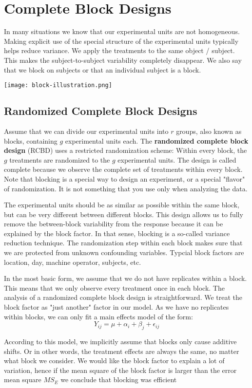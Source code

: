 \section{Complete Block Designs}

In many situations we know that our experimental units are not homogeneous. Making explicit use of the special structure of the experimental units typically helps reduce variance. We apply the treatments to the same object / subject. This makes the subject-to-subject variability completely disappear. We also say that we block on subjects or that an individual subject is a block.
\begin{center}
	\texttt{[image: block-illustration.png]}
\end{center}


\subsection{Randomized Complete Block Designs}

Assume that we can divide our experimental units into $r$ groups, also known as blocks, containing $g$ experimental units each. The \textbf{randomized complete block design} (RCBD) uses a restricted randomization scheme: Within every block, the $g$ treatments are randomized to the $g$ experimental units. The design is called complete because we observe the complete set of treatments within every block. Note that blocking is a special way to design an experiment, or a special "flavor" of randomization. It is not something that you use only when analyzing the data. \medskip

The experimental units should be as similar as possible within the same block, but can be very different between different blocks. This design allows us to fully remove the between-block variability from the response because it can be explained by the block factor. In that sense, blocking is a so-called variance reduction technique. The randomization step within each block makes sure that we are protected from unknown confounding variables. Typcial block factors are location, day, machine operator, subjects, etc. \medskip

In the most basic form, we assume that we do not have replicates within a block. This means that we only observe every treatment once in each block. The analysis of a randomized complete block design is straightforward. We treat the block factor as "just another" factor in our model. As we have no replicates within blocks, we can only fit a main effects model of the form:
$$Y_{ij} = \mu + \alpha_i + \beta_j + \epsilon_{ij}$$

According to this model, we implicitly assume that blocks only cause additive shifts. Or in other words, the treatment effects are always the same, no matter what block we consider. We would like the block factor to explain a lot of variation, hence if the mean square of the block factor is larger than the error mean square $MS_E$ we conclude that blocking was efficient


